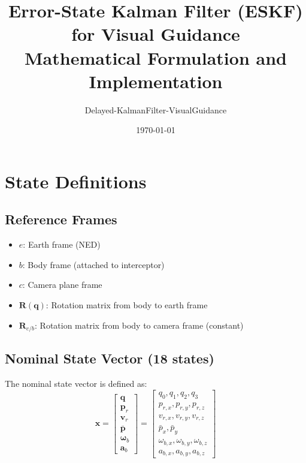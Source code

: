 \documentclass[11pt,a4paper]{article}
\title{Error-State Kalman Filter (ESKF) for Visual Guidance\\
\large Mathematical Formulation and Implementation}
\author{Delayed-KalmanFilter-VisualGuidance}
\date{\today}
\newcommand{\quat}{\mathbf{q}}
\newcommand{\pr}{\mathbf{p}_r}
\newcommand{\vr}{\mathbf{v}_r}
\newcommand{\pbar}{\bar{\mathbf{p}}}
\newcommand{\bgyr}{\bm{\omega}_b}
\newcommand{\bacc}{\mathbf{a}_b}
\newcommand{\R}{\mathbf{R}}
\begin{document}
\maketitle

\tableofcontents
\newpage

\section{State Definitions}

\subsection{Reference Frames}
\begin{itemize}
    \item $e$: Earth frame (NED)
    \item $b$: Body frame (attached to interceptor)
    \item $c$: Camera plane frame
    \item $\R(\quat)$: Rotation matrix from body to earth frame
    \item $\R_{c/b}$: Rotation matrix from body to camera frame (constant)
\end{itemize}

\subsection{Nominal State Vector (18 states)}
The nominal state vector is defined as:
\begin{equation}
    \mathbf{x} = \begin{bmatrix} \quat \\ \pr \\ \vr \\ \pbar \\ \bgyr \\ \bacc \end{bmatrix}
    = \begin{bmatrix} 
        q_0, q_1, q_2, q_3 \\ 
        p_{r,x}, p_{r,y}, p_{r,z} \\ 
        v_{r,x}, v_{r,y}, v_{r,z} \\ 
        \bar{p}_x, \bar{p}_y \\ 
        \omega_{b,x}, \omega_{b,y}, \omega_{b,z} \\ 
        a_{b,x}, a_{b,y}, a_{b,z}
    \end{bmatrix}
\end{equation}
\end{document}
